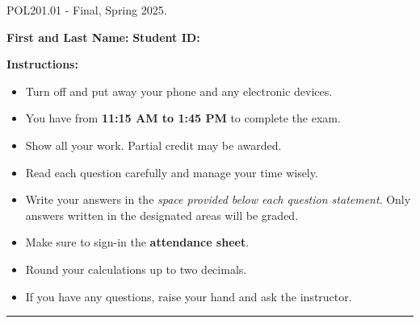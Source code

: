 \documentclass{article}
\begin{document}
 \hspace{1em} \vspace{-1.7em} %
\begin{center}
   \Large    POL201.01 - Final, Spring 2025.
\end{center}

\vspace{1em}
\noindent\textbf{First and Last Name:} \underline{\hspace{8cm}}  \quad  \textbf{Student ID:} \underline{\hspace{4.4cm}} 

\vspace{0.7em}
\noindent\textbf{Instructions:} 

\vspace{-0.8em}
\begin{itemize}
    \setlength{\itemsep}{-0.35em}
    \item Turn off and put away your phone and any electronic devices.
    \item You have from \textbf{11:15 AM to 1:45 PM} to complete the exam.
    \item Show all your work. Partial credit may be awarded.
    \item Read each question carefully and manage your time wisely.
    \item Write your answers in the \emph{space provided below each question statement}. Only answers written in the designated areas will be graded.
    \item Make sure to sign-in the \textbf{attendance sheet}.
    \item Round your calculations up to two decimals.
    \item If you have any questions, raise your hand and ask the instructor.
\end{itemize}
\vspace{-1.1em}
\noindent\rule{\linewidth}{0.4pt} %

\end{document}
